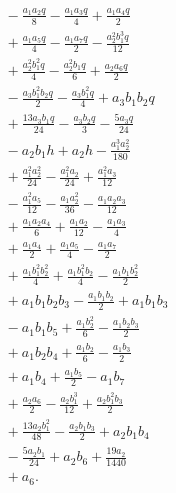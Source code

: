 \begin{align*}
&{}- \frac{a_{1} a_{2} q}{8} - \frac{a_{1} a_{3} q}{4} + \frac{a_{1} a_{4} q}{2}\\
&{}+ \frac{a_{1} a_{5} q}{4} - \frac{a_{1} a_{7} q}{2} - \frac{a_{2}^{2} b_{1}^{3} q}{12}\\
&{}+ \frac{a_{2}^{2} b_{1}^{2} q}{4} - \frac{a_{2}^{2} b_{1} q}{6} + \frac{a_{2} a_{6} q}{2}\\
&{}- \frac{a_{3} b_{1}^{2} b_{2} q}{2} - \frac{a_{3} b_{1}^{2} q}{4} + a_{3} b_{1} b_{2} q\\
&{}+ \frac{13 a_{3} b_{1} q}{24} - \frac{a_{3} b_{2} q}{3} - \frac{5 a_{3} q}{24}\\
&{}- a_{2} b_{1} h + a_{2} h - \frac{a_{1}^{3} a_{2}^{2}}{180}\\
&{}+ \frac{a_{1}^{2} a_{2}^{2}}{24} - \frac{a_{1}^{2} a_{2}}{24} + \frac{a_{1}^{2} a_{3}}{12}\\
&{}- \frac{a_{1}^{2} a_{5}}{12} - \frac{a_{1} a_{2}^{2}}{36} - \frac{a_{1} a_{2} a_{3}}{12}\\
&{}+ \frac{a_{1} a_{2} a_{4}}{6} + \frac{a_{1} a_{2}}{12} - \frac{a_{1} a_{3}}{4}\\
&{}+ \frac{a_{1} a_{4}}{2} + \frac{a_{1} a_{5}}{4} - \frac{a_{1} a_{7}}{2}\\
&{}+ \frac{a_{1} b_{1}^{2} b_{2}^{2}}{4} + \frac{a_{1} b_{1}^{2} b_{2}}{4} - \frac{a_{1} b_{1} b_{2}^{2}}{2}\\
&{}+ a_{1} b_{1} b_{2} b_{3} - \frac{a_{1} b_{1} b_{2}}{2} + a_{1} b_{1} b_{3}\\
&{}- a_{1} b_{1} b_{5} + \frac{a_{1} b_{2}^{2}}{6} - \frac{a_{1} b_{2} b_{3}}{2}\\
&{}+ a_{1} b_{2} b_{4} + \frac{a_{1} b_{2}}{6} - \frac{a_{1} b_{3}}{2}\\
&{}+ a_{1} b_{4} + \frac{a_{1} b_{5}}{2} - a_{1} b_{7}\\
&{}+ \frac{a_{2} a_{6}}{2} - \frac{a_{2} b_{1}^{3}}{12} + \frac{a_{2} b_{1}^{2} b_{3}}{2}\\
&{}+ \frac{13 a_{2} b_{1}^{2}}{48} - \frac{a_{2} b_{1} b_{3}}{2} + a_{2} b_{1} b_{4}\\
&{}- \frac{5 a_{2} b_{1}}{24} + a_{2} b_{6} + \frac{19 a_{2}}{1440}\\
&{}+ a_{6}.
\end{align*}
